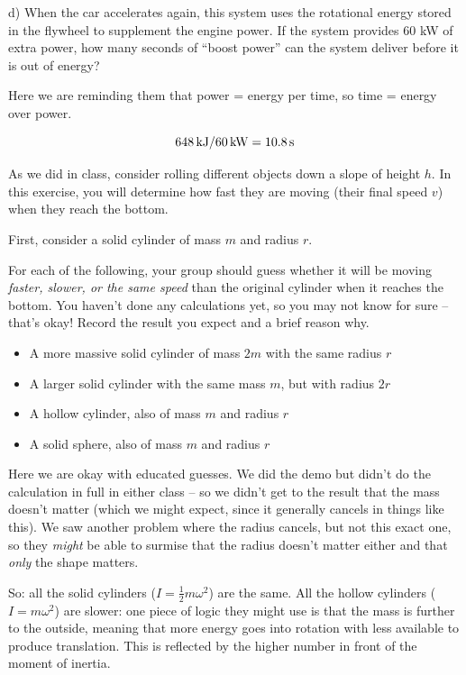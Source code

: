 \documentclass[12pt]{article}
\begin{document}
\begin{enumerate}
{d) When the car accelerates again, this system uses the rotational energy stored in the flywheel to supplement the engine power. If the system provides 60 kW of extra power, how many seconds of ``boost power'' can the system deliver before it is out of energy?

{\color{red}  Here we are reminding them that power = energy per time, so time = energy over power.}

{\color{blue} $$648\, {\text {kJ}} / 60 \, \text{kW} = 10.8 \,\rm s$$

}

\newpage

\item {

As we did in class, consider rolling different objects down a slope of height $h$. In this exercise, you will determine how fast they are moving (their final speed $v$) when they reach the bottom.

First, consider a solid cylinder of mass $m$ and radius $r$. 

For each of the following, your group should guess whether it will be moving \textit{faster, slower, or the same speed} than the original cylinder when it reaches the bottom. You haven't done any calculations yet, so you may not know for sure -- that's okay! Record the result you expect and a brief reason why.

\begin{itemize}
\item A more massive solid cylinder of mass $2m$ with the same radius $r$
\item A larger solid cylinder with the same mass $m$, but with radius $2r$
\item A hollow cylinder, also of mass $m$ and radius $r$
\item A solid sphere, also of mass $m$ and radius $r$
\end{itemize}

{\color{red}  
Here we are okay with educated guesses. We did the demo but didn't do the calculation in full in either class -- so we didn't get to the result that the mass doesn't matter (which we might expect, since it generally cancels in things like this). We saw another problem where the radius cancels, but not this exact one, so they {\it might} be able to surmise that the radius doesn't matter either and that {\it only} the shape matters.

So: all the solid cylinders ($I=\frac{1}{2}m\omega^2$) are the same. All the hollow cylinders ($I = m \omega ^2$) are slower: one piece of logic they might use is that the mass is further to the outside, meaning that more energy goes into rotation with less available to produce translation. This is reflected by the higher number in front of the moment of inertia.

}}}
\end{enumerate}
\end{document}
